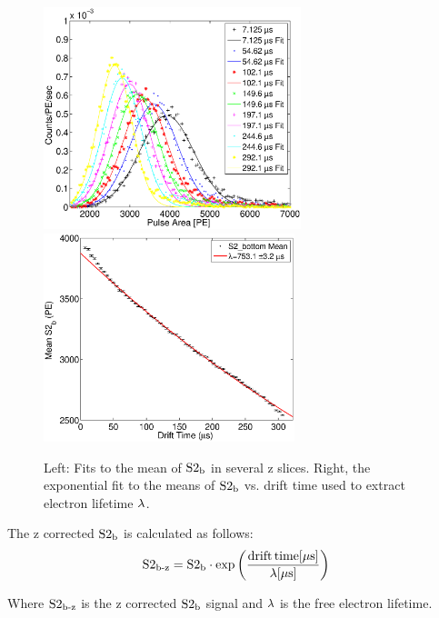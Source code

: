 \begin{figure}[h!]\centering
\includegraphics[width=75mm]{Chapter_XYZ_Corr/Thesis_Corr_Plots/S2_bottom_hist_EL.eps}
\includegraphics[width=73mm]{Chapter_XYZ_Corr/Thesis_Corr_Plots/S2_bottom_lifetime.eps}
\caption{Left: Fits to the mean of $\rm S2_b$ in several z slices. Right, the exponential fit to the means of $\rm S2_b$ vs. drift time used to extract electron lifetime $\rm \lambda$. }
\label{fig:S2_EL}
\end{figure}

The z corrected $\rm S2_b$ is calculated as follows:
\begin{equation}
\rm S2_{\operatorname{b-z}}=S2_b\cdot exp\left(\frac{drift\,time[\mu s]}{\lambda[\mu s]}\right)
\label{eq:S2_Z}
\end{equation}

Where $\rm S2_{\operatorname{b-z}}$ is the z corrected $\rm S2_b$ signal and $\rm \lambda$ is the free electron lifetime.

